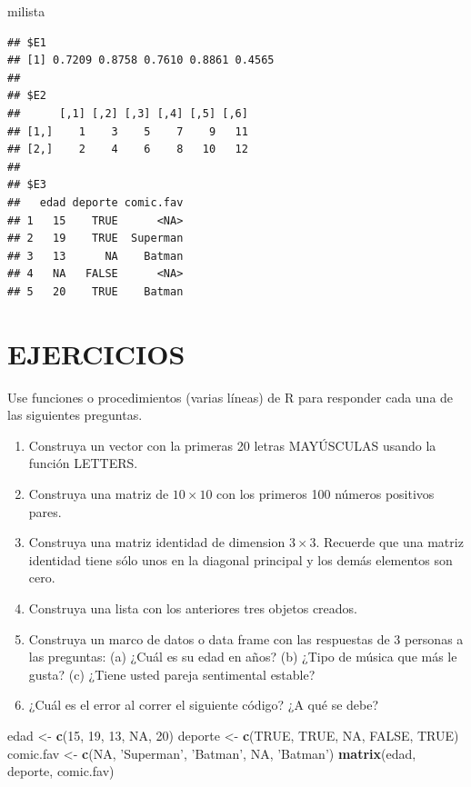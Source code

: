 \documentclass[10pt,]{krantz}
\makeatletter
\newenvironment{Shaded}{\begin{snugshade}}{\end{snugshade}}
\newcommand{\KeywordTok}[1]{\textcolor[rgb]{0.13,0.29,0.53}{\textbf{{#1}}}}
\newcommand{\DecValTok}[1]{\textcolor[rgb]{0.00,0.00,0.81}{{#1}}}
\newcommand{\StringTok}[1]{\textcolor[rgb]{0.31,0.60,0.02}{{#1}}}
\newcommand{\OtherTok}[1]{\textcolor[rgb]{0.56,0.35,0.01}{{#1}}}
\newcommand{\NormalTok}[1]{{#1}}
\let\proglang=\textsf
\newenvironment{kframe}{%
\medskip{}
\setlength{\fboxsep}{.8em}
 \def\at@end@of@kframe{}%
 \ifinner\ifhmode%
  \def\at@end@of@kframe{\end{minipage}}%
  \begin{minipage}{\columnwidth}%
 \fi\fi%
 \def\FrameCommand##1{\hskip\@totalleftmargin \hskip-\fboxsep
 \colorbox{shadecolor}{##1}\hskip-\fboxsep
     \hskip-\linewidth \hskip-\@totalleftmargin \hskip\columnwidth}%
 \MakeFramed {\advance\hsize-\width
   \@totalleftmargin\z@ \linewidth\hsize
   \@setminipage}}%
 {\par\unskip\endMakeFramed%
 \at@end@of@kframe}
\renewenvironment{Shaded}{\begin{kframe}}{\end{kframe}}
\makeatother
\begin{document}
\begin{Shaded}
\begin{Highlighting}[]
\NormalTok{milista}
\end{Highlighting}
\end{Shaded}

\begin{verbatim}
## $E1
## [1] 0.7209 0.8758 0.7610 0.8861 0.4565
## 
## $E2
##      [,1] [,2] [,3] [,4] [,5] [,6]
## [1,]    1    3    5    7    9   11
## [2,]    2    4    6    8   10   12
## 
## $E3
##   edad deporte comic.fav
## 1   15    TRUE      <NA>
## 2   19    TRUE  Superman
## 3   13      NA    Batman
## 4   NA   FALSE      <NA>
## 5   20    TRUE    Batman
\end{verbatim}

\section*{EJERCICIOS}\label{ejercicios}


Use funciones o procedimientos (varias líneas) de \proglang{R} para
responder cada una de las siguientes preguntas.

\begin{enumerate}
\def\labelenumi{\arabic{enumi}.}
\item
  Construya un vector con la primeras 20 letras MAYÚSCULAS usando la
  función LETTERS.
\item
  Construya una matriz de \(10 \times 10\) con los primeros 100 números
  positivos pares.
\item
  Construya una matriz identidad de dimension \(3 \times 3\). Recuerde
  que una matriz identidad tiene sólo unos en la diagonal principal y
  los demás elementos son cero.
\item
  Construya una lista con los anteriores tres objetos creados.
\item
  Construya un marco de datos o data frame con las respuestas de 3
  personas a las preguntas: (a) ¿Cuál es su edad en años? (b) ¿Tipo de
  música que más le gusta? (c) ¿Tiene usted pareja sentimental estable?
\item
  ¿Cuál es el error al correr el siguiente código? ¿A qué se debe?
\end{enumerate}

\begin{Shaded}
\begin{Highlighting}[]
\NormalTok{edad <-}\StringTok{ }\KeywordTok{c}\NormalTok{(}\DecValTok{15}\NormalTok{, }\DecValTok{19}\NormalTok{, }\DecValTok{13}\NormalTok{, }\OtherTok{NA}\NormalTok{, }\DecValTok{20}\NormalTok{)}
\NormalTok{deporte <-}\StringTok{ }\KeywordTok{c}\NormalTok{(}\OtherTok{TRUE}\NormalTok{, }\OtherTok{TRUE}\NormalTok{, }\OtherTok{NA}\NormalTok{, }\OtherTok{FALSE}\NormalTok{, }\OtherTok{TRUE}\NormalTok{)}
\NormalTok{comic.fav <-}\StringTok{ }\KeywordTok{c}\NormalTok{(}\OtherTok{NA}\NormalTok{, }\StringTok{'Superman'}\NormalTok{, }\StringTok{'Batman'}\NormalTok{, }\OtherTok{NA}\NormalTok{, }\StringTok{'Batman'}\NormalTok{)}
\KeywordTok{matrix}\NormalTok{(edad, deporte, comic.fav)}
\end{Highlighting}
\end{Shaded}
\end{document}
